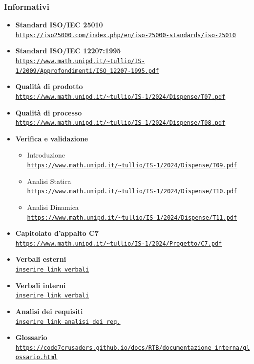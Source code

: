 \documentclass{article}
\begin{document}
\subsubsection{Informativi}
\begin{itemize}
    \item \textbf{Standard ISO/IEC 25010} \\ \texttt{\url{https://iso25000.com/index.php/en/iso-25000-standards/iso-25010}}
    \item \textbf{Standard ISO/IEC 12207:1995} \\ \texttt{\url{https://www.math.unipd.it/~tullio/IS-1/2009/Approfondimenti/ISO_12207-1995.pdf}}
    \item \textbf{Qualità di prodotto} \\ \texttt{\url{https://www.math.unipd.it/~tullio/IS-1/2024/Dispense/T07.pdf}}
    \item \textbf{Qualità di processo} \\ \texttt{\url{https://www.math.unipd.it/~tullio/IS-1/2024/Dispense/T08.pdf}}
    \item \textbf{Verifica e validazione}
    \begin{itemize}
        \item Introduzione \\ \texttt{\url{https://www.math.unipd.it/~tullio/IS-1/2024/Dispense/T09.pdf}}
        \item Analisi Statica \\ \texttt{\url{https://www.math.unipd.it/~tullio/IS-1/2024/Dispense/T10.pdf}}
        \item Analisi Dinamica \\ \texttt{\url{https://www.math.unipd.it/~tullio/IS-1/2024/Dispense/T11.pdf}}
    \end{itemize}
    \item \textbf{Capitolato d'appalto C7} \\ \texttt{\url{https://www.math.unipd.it/~tullio/IS-1/2024/Progetto/C7.pdf}}
    \item \textbf{Verbali esterni} \\ \texttt{\url{inserire link verbali}}
    \item \textbf{Verbali interni} \\ \texttt{\url{inserire link verbali}}
    \item \textbf{Analisi dei requisiti} \\ \texttt{\url{inserire link analisi dei req.}}
    \item \textbf{Glossario} \\ \texttt{\url{https://code7crusaders.github.io/docs/RTB/documentazione_interna/glossario.html}}
\end{itemize}
\newpage
\end{document}
